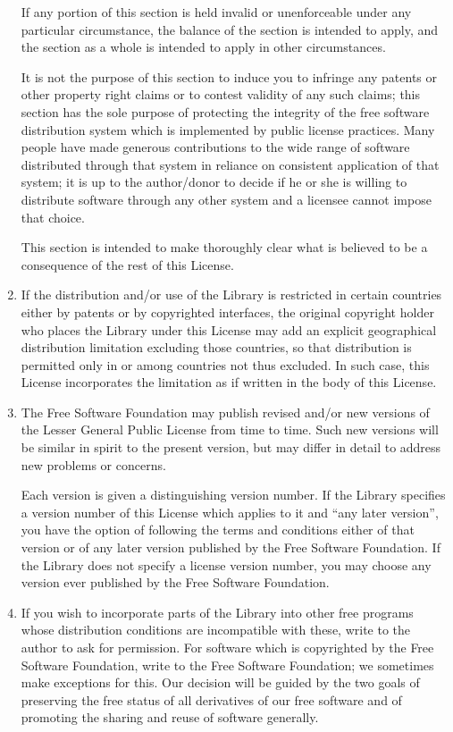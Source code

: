 \begin{enumerate}
If any portion of this section is held invalid or unenforceable under any
particular circumstance, the balance of the section is intended to apply,
and the section as a whole is intended to apply in other circumstances.

It is not the purpose of this section to induce you to infringe any
patents or other property right claims or to contest validity of any
such claims; this section has the sole purpose of protecting the
integrity of the free software distribution system which is
implemented by public license practices.  Many people have made
generous contributions to the wide range of software distributed
through that system in reliance on consistent application of that
system; it is up to the author/donor to decide if he or she is willing
to distribute software through any other system and a licensee cannot
impose that choice.

This section is intended to make thoroughly clear what is believed to
be a consequence of the rest of this License.

\item
If the distribution and/or use of the Library is restricted in
certain countries either by patents or by copyrighted interfaces, the
original copyright holder who places the Library under this License may add
an explicit geographical distribution limitation excluding those countries,
so that distribution is permitted only in or among countries not thus
excluded.  In such case, this License incorporates the limitation as if
written in the body of this License.

\item
The Free Software Foundation may publish revised and/or new
versions of the Lesser General Public License from time to time.
Such new versions will be similar in spirit to the present version,
but may differ in detail to address new problems or concerns.

Each version is given a distinguishing version number.  If the Library
specifies a version number of this License which applies to it and
``any later version'', you have the option of following the terms and
conditions either of that version or of any later version published by
the Free Software Foundation.  If the Library does not specify a
license version number, you may choose any version ever published by
the Free Software Foundation.

\item
If you wish to incorporate parts of the Library into other free
programs whose distribution conditions are incompatible with these,
write to the author to ask for permission.  For software which is
copyrighted by the Free Software Foundation, write to the Free
Software Foundation; we sometimes make exceptions for this.  Our
decision will be guided by the two goals of preserving the free status
of all derivatives of our free software and of promoting the sharing
and reuse of software generally.


\end{enumerate}
